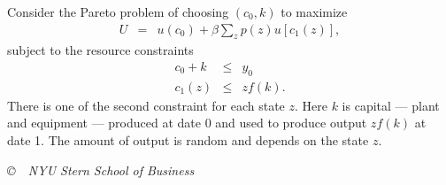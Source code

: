 \documentclass[11pt]{exam}
\begin{document}
\begin{questions}
\begin{solution}
\begin{parts}
\end{parts}
\end{solution}


Consider the Pareto problem of choosing $(c_0,k)$ to maximize
\begin{eqnarray*}
    U &=& u(c_0) + \beta \sum_z p(z) u[c_1(z)],
\end{eqnarray*}
subject to the resource constraints
\begin{eqnarray*}
    c_0 + k &\leq& y_0 \\
    c_1(z)  &\leq& z f(k) .
\end{eqnarray*}
There is one of the second constraint for each state $z$.
Here $k$ is capital --- plant and equipment --- produced at date 0 and used
to produce output $z f(k)$ at date 1.
The amount of output is random and depends on the state $z$.


\begin{solution}
\end{solution}

\end{questions}

\vfill \centerline{\it \copyright \ \number\year \
NYU Stern School of Business}
\end{document}
